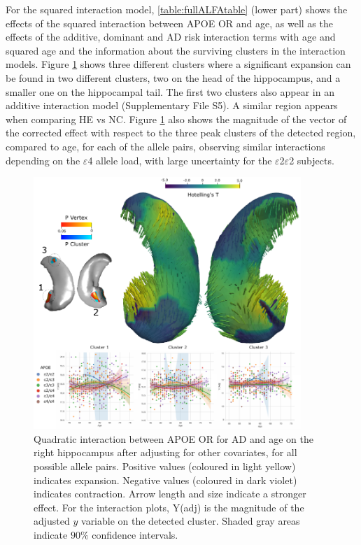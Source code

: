 For the squared interaction model, \ref{table:fullALFAtable} (lower part) shows the effects of the squared interaction between APOE OR and age, as well as the effects of the additive,  dominant and AD risk interaction terms with age and squared age and the information about the surviving clusters in the interaction models. Figure \ref{fig:alfainteractionfig2} shows three different clusters where a significant expansion can be found in two different clusters, two on the head of the hippocampus, and a smaller one on the hippocampal tail. The first two clusters also appear in an additive interaction model (Supplementary File S5). A similar region appears when comparing HE vs NC. Figure \ref{fig:alfainteractionfig2} also shows the magnitude of the vector of the corrected effect with respect to the three peak clusters of the detected region, compared to age, for each of the allele pairs, observing similar interactions depending on the $\varepsilon$4 allele load, with large uncertainty for the $\varepsilon$2$\varepsilon$2 subjects. \\

\begin{figure}[htbp]
  \centering
  \includegraphics[width=0.9\textwidth]{figures/hippocampus/fig_interactionapoealfa_OR.pdf}
  \caption[Quadratic interaction between APOE OR for AD and age on the right hippocampus.]{Quadratic interaction between APOE OR for AD and age on the right hippocampus after adjusting for other covariates, for all possible allele pairs. Positive values (coloured in light yellow) indicates expansion. Negative values (coloured in dark violet) indicates contraction. Arrow length and size indicate a stronger effect. For the interaction plots, Y(adj) is the magnitude of the adjusted $y$ variable on the detected cluster. Shaded gray areas indicate $90\%$ confidence intervals.}\label{fig:alfainteractionfig2}
\end{figure}

